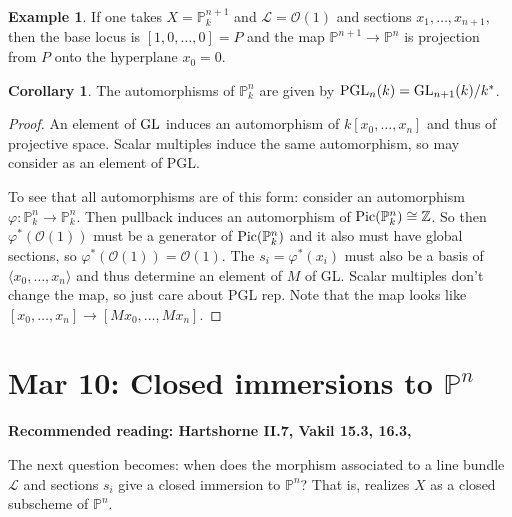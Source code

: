 \documentclass[10pt,reqno]{amsart}
\theoremstyle{definition}
\newtheorem{corollary}[theorem]{Corollary}
\newtheorem{example}[theorem]{Example}
\theoremstyle{remark}
\numberwithin{equation}{section}
\numberwithin{theorem}{section}
\newcommand{\Z}{{\mathbb Z}}
\newcommand{\OO}{{\mathcal O}}
\newcommand{\Pic}{\textup{Pic}}
\newcommand{\LL}{{\mathscr L}}
\newcommand{\PP}{{\mathbb P}}
\begin{document}
\begin{example} If one takes $X = \PP^{n+1}_k$ and $\LL = \OO(1)$ and sections $x_1,\dots,x_{n+1}$, then the base locus is $[1,0,\dots,0] = P$ and the map $\PP^{n+1} \to \PP^n$ is projection from $P$ onto the hyperplane $x_0 = 0$.
\end{example}

\begin{corollary} The automorphisms of $\PP^n_k$ are given by $\textup{PGL}_n(k) = \textup{GL}_{n+1}(k)/k^*$.
\end{corollary}
\begin{proof} An element of $\textup{GL}$ induces an automorphism of $k[x_0,\dots,x_n]$ and thus of projective space. Scalar multiples induce the same automorphism, so may consider as an element of PGL.

To see that all automorphisms are of this form: consider an automorphism $\varphi: \PP^n_k \to \PP^n_k$. Then pullback induces an automorphism of $\Pic(\PP^n_k) \cong \Z$. So then $\varphi^*(\OO(1))$ must be a generator of $\Pic(\PP^n_k)$ and it also must have global sections, so $\varphi^*(\OO(1)) = \OO(1)$. The $s_i = \varphi^*(x_i)$ must also be a basis of $\langle x_0,\dots,x_n \rangle$ and thus determine an element of $M$ of GL. Scalar multiples don't change the map, so just care about PGL rep. Note that the map looks like $[x_0,\dots,x_n] \to [Mx_0,\dots,Mx_n]$.
\end{proof}
\section{Mar 10: Closed immersions to $\PP^n$}
\textbf{Recommended reading: Hartshorne II.7, Vakil 15.3, 16.3,}

The next question becomes: when does the morphism associated to a line bundle $\LL$ and sections $s_i$ give a closed immersion to $\PP^n$? That is, realizes $X$ as a closed subscheme of $\PP^n$.
\end{document}

